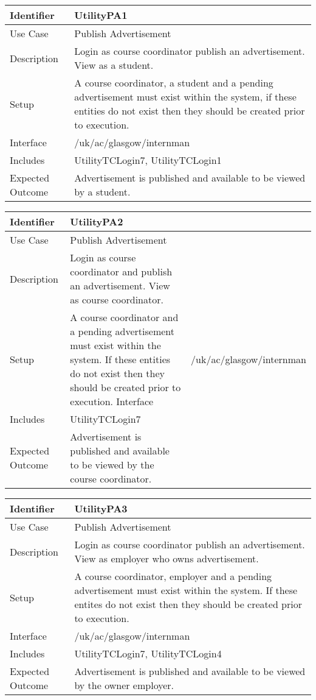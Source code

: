 \begin{tabularx}{\textwidth}{|T|L|}
\hline
Identifier & UtilityPA1\\
\hline
Use Case & Publish Advertisement \\
\hline
Description & Login as course coordinator publish an
advertisement. View as a student. \\
\hline
Setup & A course coordinator, a student and a pending advertisement
must exist within the system, if these entities do not exist then they
should be created prior to execution. \\
\hline
Interface & /uk/ac/glasgow/internman \\
\hline
Includes & UtilityTCLogin7, UtilityTCLogin1 \\
\hline
Expected Outcome & Advertisement is published and available to be viewed by
a student.\\
\hline
\end{tabularx}

\vspace{2em}

\begin{tabularx}{\textwidth}{|T|L|}
\hline
Identifier & UtilityPA2\\
\hline
Use Case & Publish Advertisement \\
\hline
Description & Login as course coordinator and publish an
advertisement. View as course coordinator.\\
\hline
Setup & A course coordinator and a pending advertisement must exist
within the system. If these entities do not exist then they should be
created prior to execution. 
\hline
Interface & /uk/ac/glasgow/internman \\
\hline
Includes & UtilityTCLogin7 \\
\hline
Expected Outcome & Advertisement is published and available to be viewed by the
course coordinator.\\
\hline
\end{tabularx}

\vspace{2em}

\begin{tabularx}{\textwidth}{|T|L|}
\hline
Identifier & UtilityPA3\\
\hline
Use Case & Publish Advertisement \\
\hline
Description & Login as course coordinator publish an
advertisement. View as employer who owns advertisement. \\
\hline
Setup & A course coordinator, employer and a pending advertisement
must exist within the system. If these entites do not exist then they
should be created prior to execution. \\
\hline
Interface & /uk/ac/glasgow/internman \\
\hline
Includes & UtilityTCLogin7, UtilityTCLogin4 \\
\hline
Expected Outcome & Advertisement is published and available to be viewed by the
owner employer.\\
\hline
\end{tabularx}

